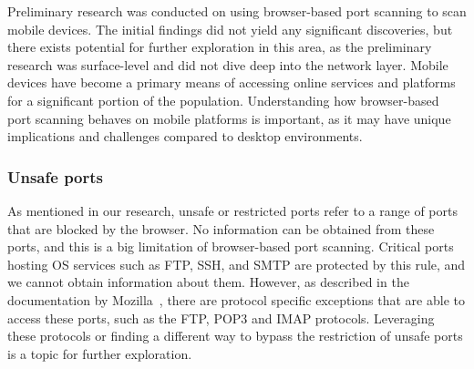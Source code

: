 Preliminary research was conducted on using browser-based port scanning to scan mobile devices. The initial findings did not yield any significant discoveries, but there exists potential for further exploration in this area, as the preliminary research was surface-level and did not dive deep into the network layer.
Mobile devices have become a primary means of accessing online services and platforms for a significant portion of the population. Understanding how browser-based port scanning behaves on mobile platforms is important, as it may have unique implications and challenges compared to desktop environments.

\subsubsection{Unsafe ports}
As mentioned in our research, unsafe or restricted ports refer to a range of ports that are blocked by the browser.
No information can be obtained from these ports, and this is a big limitation of browser-based port scanning. 
Critical ports hosting OS services such as FTP, SSH, and SMTP are protected by this rule, and we cannot obtain information about them.
However, as described in the documentation by Mozilla~\cite{firefox_restricted_ports}, there are protocol specific exceptions that are able to access these ports, such as the FTP, POP3 and IMAP protocols.
Leveraging these protocols or finding a different way to bypass the restriction of unsafe ports is a topic for further exploration. 




